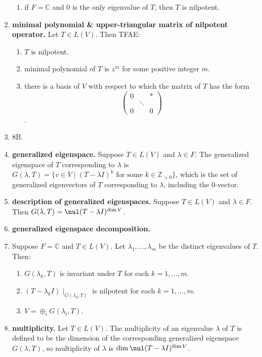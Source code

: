 \begin{enumerate}
\begin{enumerate}
		\item if $F = \mathbb{C}$ and 0 is the only eigenvalue of $T$, then $T$ is nilpotent. 
	\end{enumerate}
	\item \textbf{minimal polynomial \& upper-triangular matrix of nilpotent operator. } Let $T \in L(V)$. Then TFAE: 
	\begin{enumerate}
		\item $T$ is nilpotent. 
		\item minimal polynomial of $T$ is $z^m$ for some positive integer $m$. 
		\item there is a basis of $V$ with respect to which the matrix of $T$ has the form
		$$
		\begin{pmatrix}
		0 & & * \\
		 & \ddots & \\
		0 & & 0
		\end{pmatrix}
		$$. 
	\end{enumerate}
	\item 8B. 
	\item \textbf{generalized eigenspace. } Suppose $T \in L(V)$ and $\lambda \in F$. The generalized eigenspace of $T$ corresponding to $\lambda$ is $G(\lambda, T) = \{v \in V \mid (T - \lambda I)^k \textrm{ for some } k \in \mathbb{Z}_{>0}\}$, which is the set of generalized eigenvectors of $T$ corresponding to $\lambda$, including the 0-vector. 
	\item \textbf{description of generalized eigenspaces. } Suppose $T \in L(V)$ and $\lambda \in F$. Then $G(\lambda, T) = \nul(T - \lambda I)^{\dim V}$. 
	\item \textbf{generalized eigenspace decomposition. } 
	\item Suppose $F = \mathbb{C}$ and $T \in L(V)$. Let $\lambda_1,\dots,\lambda_m$ be the distinct eigenvalues of $T$. Then: 
	\begin{enumerate}
		\item $G(\lambda_k,T)$ is invariant under $T$ for each $k=1,\dots,m$. 
		\item $(T - \lambda_k I) \mid_{G(\lambda_k, T)}$ is nilpotent for each $k=1,\dots,m$. 
		\item $V = \oplus_i G(\lambda_i, T)$. 
	\end{enumerate}
	\item \textbf{multiplicity. } Let $T \in L(V)$. The multiplicity of an eigenvalue $\lambda$ of $T$ is defined to be the dimension of the corresponding generalized eigenspace $G(\lambda, T)$, so multiplicity of $\lambda$ is $\dim \nul(T - \lambda I)^{\dim V}$. 

\end{enumerate}
